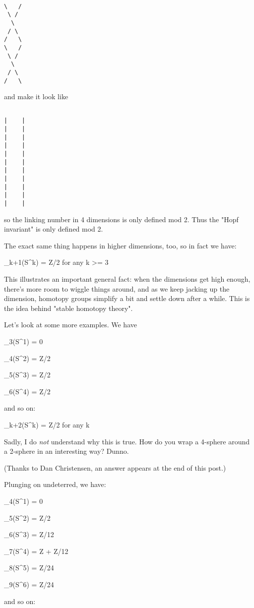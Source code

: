 \begin{verbatim}

\   /
 \ /
  \
 / \
/   \
\   /
 \ /
  \
 / \
/   \

\end{verbatim}
    
and make it look like


\begin{verbatim}

|    |
|    |
|    |
|    |
|    |
|    |
|    |
|    |
|    |
|    |
|    |

\end{verbatim}
    
so the linking number in 4 dimensions is only defined mod 2.  Thus
the "Hopf invariant" is only defined mod 2.  

The exact same thing happens in higher dimensions, too, so in fact we
have:

\pi _{k+1}(S^{k}) = Z/2       for any k >= 3

This illustrates an important general fact: when the dimensions get high
enough, there's more room to wiggle things around, and as we keep
jacking up the dimension, homotopy groups simplify a bit and settle down
after a while.  This is the idea behind "stable homotopy theory".

Let's look at some more examples.  We have

\pi _{3}(S^{1}) = {0}

\pi _{4}(S^{2}) = Z/2

\pi _{5}(S^{3}) = Z/2

\pi _{6}(S^{4}) = Z/2

and so on:

\pi _{k+2}(S^{k}) = Z/2       for any k 

Sadly, I do \emph{not} understand why this is true.  How do you wrap a
4-sphere around a 2-sphere in an interesting way?  Dunno.  

(Thanks to Dan Christensen, an answer appears at the end of this post.)

Plunging on undeterred, we have:

\pi _{4}(S^{1}) = {0}

\pi _{5}(S^{2}) = Z/2

\pi _{6}(S^{3}) = Z/12

\pi _{7}(S^{4}) = Z + Z/12

\pi _{8}(S^{5}) = Z/24

\pi _{9}(S^{6}) = Z/24

and so on:

